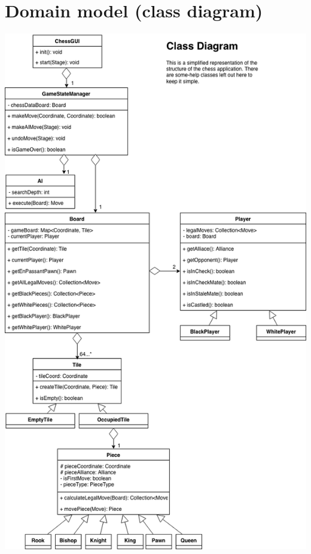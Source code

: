 \documentclass{article}
\begin{document}
    \section{Domain model (class diagram)}
    \begin{center}
    \includegraphics[scale=0.38]{class-diagram.png}
    \end{center}
\end{document}

